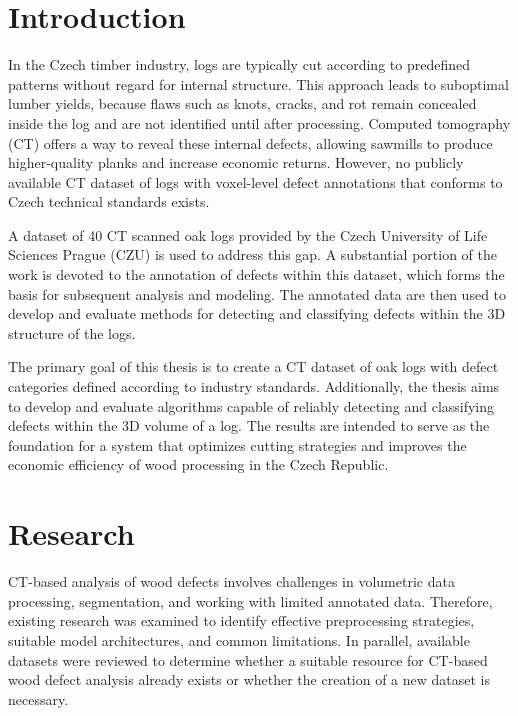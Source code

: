 \chapter*{Introduction}

In the Czech timber industry, logs are typically cut according to predefined patterns without regard for internal structure. This approach leads to suboptimal lumber yields, because flaws such as knots, cracks, and rot remain concealed inside the log and are not identified until after processing. Computed tomography (CT) offers a way to reveal these internal defects, allowing sawmills to produce higher-quality planks and increase economic returns. However, no publicly available CT dataset of logs with voxel-level defect annotations that conforms to Czech technical standards exists.

A dataset of 40 CT scanned oak logs provided by the Czech University of Life Sciences Prague (CZU) is used to address this gap. A substantial portion of the work is devoted to the annotation of defects within this dataset, which forms the basis for subsequent analysis and modeling. The annotated data are then used to develop and evaluate methods for detecting and classifying defects within the 3D structure of the logs.

The primary goal of this thesis is to create a CT dataset of oak logs with defect categories defined according to industry standards. Additionally, the thesis aims to develop and evaluate algorithms capable of reliably detecting and classifying defects within the 3D volume of a log. The results are intended to serve as the foundation for a system that optimizes cutting strategies and improves the economic efficiency of wood processing in the Czech Republic.

\setcounter{page}{1}


\chapter{Research}
\label{chap:research}
CT-based analysis of wood defects involves challenges in volumetric data processing, segmentation, and working with limited annotated data. Therefore, existing research was examined to identify effective preprocessing strategies, suitable model architectures, and common limitations. In parallel, available datasets were reviewed to determine whether a suitable resource for CT-based wood defect analysis already exists or whether the creation of a new dataset is necessary.



